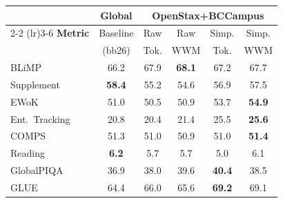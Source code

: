 \documentclass[11pt]{article}
\begin{document}
\begin{center}
\centering
\footnotesize
\setlength{\tabcolsep}{3pt}
\begin{tabular}{lccccc}
\toprule
& \textbf{Global} & \multicolumn{4}{c}{\textbf{OpenStax+BCCampus}} \\
\cmidrule(lr){2-2} \cmidrule(lr){3-6}
\textbf{Metric} & Baseline & Raw & Raw & Simp. & Simp. \\
& (bb26) & Tok. & WWM & Tok. & WWM \\
\midrule
BLiMP & 66.2 & 67.9 & \textbf{68.1} & 67.2 & 67.7 \\
Supplement & \textbf{58.4} & 55.2 & 54.6 & 56.9 & 57.5 \\
EWoK & 51.0 & 50.5 & 50.9 & 53.7 & \textbf{54.9} \\
Ent.\ Tracking & 20.8 & 20.4 & 21.4 & 25.5 & \textbf{25.6} \\
COMPS & 51.3 & 51.0 & 50.9 & 51.0 & \textbf{51.4} \\
Reading & \textbf{6.2} & 5.7 & 5.7 & 5.0 & 6.1 \\
GlobalPIQA & 36.9 & 38.0 & 39.6 & \textbf{40.4} & 38.5 \\
GLUE & 64.4 & 66.0 & 65.6 & \textbf{69.2} & 69.1 \\
\bottomrule
\end{tabular}
\label{tab:full-results-openstax}
\end{center}
\end{document}
